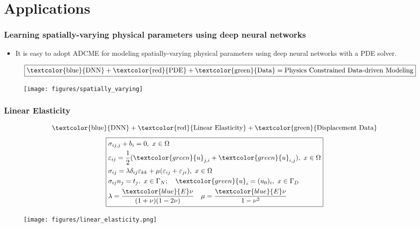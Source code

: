 \documentclass[usenames,dvipsnames]{beamer}
\begin{document}




\section{Applications}


\begin{frame}
	\frametitle{Learning spatially-varying physical parameters using deep neural networks}
	\begin{itemize}
		\item It is easy to adopt ADCME for modeling spatially-varying physical parameters using deep neural networks with a PDE solver.
		
		$$\boxed{\text{\textcolor{blue}{DNN}} + \text{\textcolor{red}{PDE}} + \text{\textcolor{green}{Data}} = \text{Physics Constrained Data-driven Modeling}}$$ 
	\end{itemize}
	\begin{figure}[hbt]
		\texttt{[image: figures/spatially\_varying]}
	\end{figure}
	
\end{frame}

\begin{frame}
	\frametitle{Linear Elasticity}

		$$\text{\textcolor{blue}{DNN}} + \text{\textcolor{red}{Linear Elasticity}} + \text{\textcolor{green}{Displacement Data}}$$ 
	\begin{equation*}
		\boxed{\begin{aligned}
			& \sigma_{ij,j}  +  b_i = 0, \ x\in \Omega\\
			&\varepsilon_{ij} = \frac{1}{2}(\textcolor{green}{u}_{j,i}+\textcolor{green}{u}_{i,j}), \ x\in \Omega\\
			& \sigma_{ij} = \lambda\delta_{ij} \varepsilon_{kk} + \mu(\varepsilon_{ij}+ \varepsilon_{ji}), \ x\in \Omega\\
			&\sigma_{ij}n_j = t_j, \ x\in \Gamma_N; \quad 	\textcolor{green}{u}_i = (u_0)_i, \ x\in \Gamma_D\\
			&	\lambda = \frac{\textcolor{blue}{E}\nu}{(1+\nu)(1-2\nu)}\quad
			\mu = \frac{\textcolor{blue}{E}\nu}{1-\nu^2}
		\end{aligned}}
	\end{equation*}
	\begin{figure}[hbt]
	\texttt{[image: figures/linear\_elasticity.png]}
\end{figure}

\end{frame}
\end{document}
